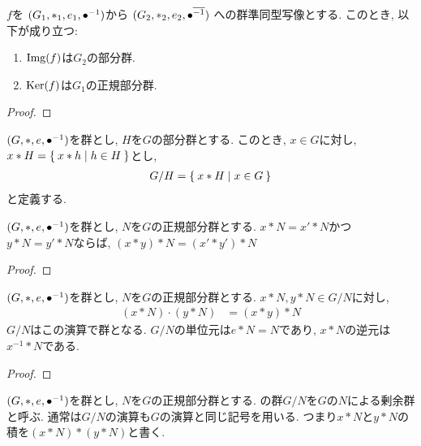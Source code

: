 \begin{prop}
  $f$を
  $(G_1,\ast_1,e_1,{\bullet}^{-1})$から
  $(G_2,\ast_2,e_2,{\bullet}^{\overline{-1}})$
  への群準同型写像とする.
  このとき, 以下が成り立つ:
  \begin{enumerate}
  \item  $\operatorname{Img}(f)$は$G_2$の部分群.
  \item  $\operatorname{Ker}(f)$は$G_1$の正規部分群.
  \end{enumerate}
\end{prop}
\begin{proof}\end{proof}


\begin{definition}
  $(G,\ast,e,{\bullet}^{-1})$を群とし,
  $H$を$G$の部分群とする.
  このとき, $x\in G$に対し, $x\ast H =\Set{x\ast h | h\in H}$とし,
  \begin{align*}
    G/H = \Set{x\ast H |x\in G}
  \end{align*}
  と定義する.
\end{definition}

\begin{lemma}
  $(G,\ast,e,{\bullet}^{-1})$を群とし,
  $N$を$G$の正規部分群とする.
  $x\ast N=x'\ast N$かつ$y\ast N = y'\ast N$ならば,
  $(x\ast y)\ast N = (x'\ast y' )\ast N$      
\end{lemma}
\begin{proof}\end{proof}
\begin{theorem}
  \label{grp:thm:quotient:group} 
  $(G,\ast,e,{\bullet}^{-1})$を群とし,
  $N$を$G$の正規部分群とする.
  $x\ast N, y\ast N \in G/N$に対し,
  \begin{align*}
    (x\ast N) \cdot (y\ast N) &= (x\ast y)\ast N
  \end{align*}
  $G/N$はこの演算で群となる.
  $G/N$の単位元は$e\ast N=N$であり,
  $x\ast N$の逆元は$x^{-1}\ast N$である.
\end{theorem}
\begin{proof}\end{proof}
\begin{definition}
  $(G,\ast,e,{\bullet}^{-1})$を群とし,
  $N$を$G$の正規部分群とする.
  の群$G/N$を$G$の$N$による剰余群と呼ぶ.
  通常は$G/N$の演算も$G$の演算と同じ記号を用いる.
  つまり$x\ast N$と$y\ast N$の積を$(x\ast N)\ast (y\ast N)$と書く.
\end{definition}

